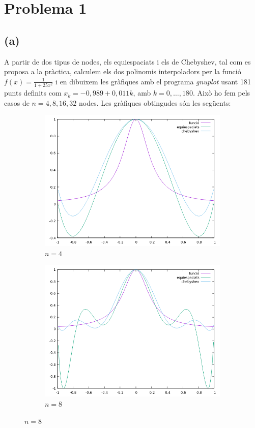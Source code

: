 \documentclass[a4paper,11pt]{article}
\begin{document}
\graphicspath{ {./imatges/} }
\section*{Problema 1}
\subsection*{(a)}
A partir de dos tipus de nodes, els equiespaciats i els de Chebyshev, tal com es proposa a la pràctica, calculem els dos polinomis interpoladors per la funció $f(x) = \frac{1}{1 + 25x^2}$ i en dibuixem les gràfiques amb el programa \textit{gnuplot} usant 181 punts definits com $x_k = -0,989 + 0,011k$, amb $k = 0, \ldots, 180$. Això ho fem pels casos de $n = 4,8,16,32$ nodes. Les gràfiques obtingudes són les següents:
  \begin{figure}[H]
  \begin{subfigure}{0.49\textwidth}
    \includegraphics[width = 0.9 \linewidth]{imatges/plot4.png}
  \centering
  \caption*{$n = 4$}
  \end{subfigure}
  \begin{subfigure}{0.49\textwidth}
    \includegraphics[width = 0.9 \linewidth]{imatges/plot8.png}
  \centering
  \caption*{$n = 8$}
  \end{subfigure}
  \end{figure}
\end{document}
